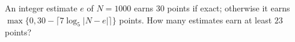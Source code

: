 An integer estimate $e$ of $N=1000$ earns $30$ points if exact; otherwise it earns $\max\{0,30-\lceil7\log_5|N-e|\rceil\}$ points. How many estimates earn at least $23$ points?
